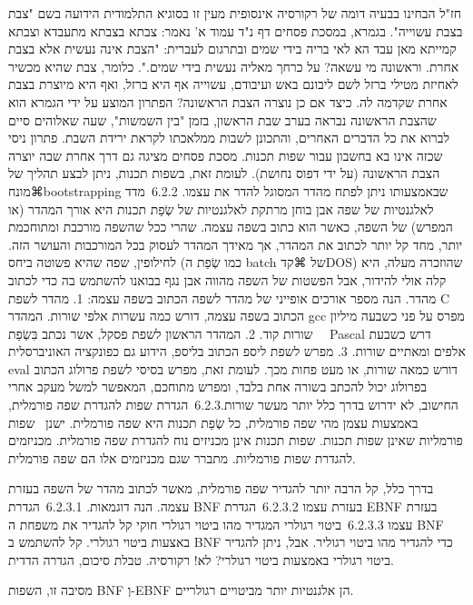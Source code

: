 חז"ל הבחינו בבעיה דומה של רקורסיה אינסופית מעין זו בסוגיא התלמודית הידועה בשם "צבת בצבת עשוייה". בגמרא, במסכת פסחים דף נ"ד עמוד א' נאמר:
צבתא בצבתא מתעבדא וצבתא קמייתא מאן עבד הא לאי בריה בידי שמים
ובתרגום לעברית: "הצבת אינה נעשית אלא בצבת אחרת. וראשונה מי עשאה? על כרחך מאליה נעשית בידי שמים.". כלומר, צבת שהיא מכשיר לאחיזת מטילי ברזל לשם ליבונם באש ועיבודם, עשוייה אף היא ברזל, ואף היא מיוצרת בצבת אחרת שקדמה לה. כיצד אם כן נוצרה הצבת הראשונה?
הפתרון המוצע על ידי הגמרא הוא שהצבת הראשונה נבראה בערב שבת הראשון, בזמן "בין השמשות", שעה שאלוהים סיים לברוא את כל הדברים האחרים, והתכונן לשבות ממלאכתו לקראת ירידת השבת. 
פתרון ניסי שכזה אינו בא בחשבון עבור שפות תכנות. מסכת פסחים מציגה גם דרך אחרת שבה יוצרה הצבת הראשונה (על ידי דפוס נחושת). לעומת זאת, בשפות תכנות, ניתן לבצע תהליך של ⌘מונח{bootstrapping} שבאמצעותו ניתן לפתח מהדר המסוגל להדר את עצמו.
​6.2.2​ מדד לאלגנטיות של שפה
אבן בוחן מרתקת לאלגנטיות של שְׂפַת תכנות היא אורך המהדר (או המפרש) של השפה, כאשר הוא כתוב בשפה עצמה. שהרי ככל שהשפה מורכבת ומתוחכמת יותר, מחד קל יותר לכתוב את המהדר, אך מאידך המהדר לעסוק בכל המורכבות והעושר הזה. 
לחילופין, שפה שהיא פשוטה ביחס (כמו שְׂפַת ה batch של ⌘קד{DOS}) שהוזכרה מעלה, היא קלה אולי להידור, אבל הפשטות של השפה מהווה אבן נגף בבואנו להשתמש בה כדי לכתוב מהדר.
הנה מספר אורכים אופייני של מהדר לשפה הכתוב בשפה עצמה: 
1. מהדר לשפת C הכתוב בשפה עצמה, דורש כמה עשרות אלפי שורות. המהדר gcc מפרס על פני כשבעה מיליון שורות קוד. 
2. המהדר הראשון לשפת פסקל, אשר נכתב בִּשְׂפַת   Pascal דרש כשבעת אלפים ומאתיים שורות.
3. מפרש לשפת ליספ הכתוב בליספ, הידוע גם כפונקציה האוניברסלית eval דורש כמאה שורות, או מעט פחות מכך. 
לעומת זאת, מפרש בסיסי לשפת פרולוג הכתוב בפרולוג יכול להכתב בשורה אחת בלבד, ומפרש מתוחכם, המאפשר למשל מעקב אחרי החישוב, לא ידרוש בדרך כלל יותר מעשר שורות.
​6.2.3​ הגדרת שפות להגדרת שפה פורמלית, באמצעות עצמן
מהי שפה פורמלית, כל שְׂפַת תכנות היא שפה פורמלית. ישנן  שפות פורמליות שאינן שפות תכנות.
שפות תכנות אינן מכניזים נוח להגדרת שפה פורמלית. 
מכניזמים להגדרת שפות פורמליות. מתברר שגם מכניזמים אלו הם שפה פורמלית.

בדרך כלל, קל הרבה יותר להגדיר שפה פורמלית, מאשר לכתוב מהדר של השפה בעזרת עצמה. 
הנה דוגמאות. 
​6.2.3.1​ הגדרת BNF בעזרת עצמו
​6.2.3.2​ הגדרת EBNF בעזרת עצמו
​6.2.3.3​ ביטוי רגולרי המגדיר מהו ביטוי רגולרי חוקי
קל להגדיר את משפחת ה BNF באצעות ביטוי רגולרי.
קל להשתמש ב BNF כדי להגדיר מהו ביטוי רגוליר.
אבל, ניתן להגדיר ביטוי רגולרי באמצעות ביטוי רגולרי? לא! רקורסיה.
טבלת סיכום, הגדרה הדדית.

מסיבה זו, השפות BNF וְ-EBNF הן אלגנטיות יותר מביטויים רגולריים.




